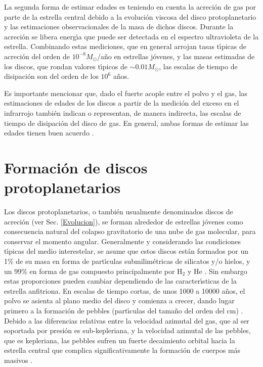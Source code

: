 \documentclass[baaa]{baaa}
\begin{document}
La segunda forma de estimar edades es teniendo en cuenta la acreci\'on de gas por parte de la estrella central debido a la evoluci\'on viscosa del disco protoplanetario y las estimaciones observacionales de la masa de dichos discos. Durante la acreci\'on se libera energ\'{\i}a que puede ser detectada en el espectro ultravioleta de la estrella. Combinando estas mediciones, que en general arrojan tasas t\'{\i}picas de acreci\'on del orden de $10^{-8}M_\odot$/a\~no en estrellas j\'ovenes, y las masas estimadas de los discos, que rondan valores t\'{\i}picos de $\sim0.01M_\odot$, las escalas de tiempo de disipaci\'on son del orden de los $10^6$ a\~nos. 

Es importante mencionar que, dado el fuerte acople entre el polvo y el gas, las estimaciones de edades de los discos a partir de la medici\'on del exceso en el infrarrojo tambi\'en indican o representan, de manera indirecta, las escalas de tiempo de disipaci\'on del disco de gas. En general, ambas formas de estimar las edades tienen buen acuerdo \citep[ver la fig. 4 de][]{Fedele2010}.

\section{Formación de discos protoplanetarios}\label{Formacion}

Los discos protoplanetarios, o tambi\'en usualmente denominados discos de acreci\'on (ver Sec. \ref{Evolucion}), se forman alrededor de estrellas j\'ovenes como consecuencia natural del colapso gravitatorio de una nube de gas molecular, para conservar el momento angular. Generalmente y considerando las condiciones t\'{\i}picas del medio interestelar, se asume que estos discos est\'an formados por un 1\% de su masa en forma de part\'{\i}culas submilim\'etricas de silicatos y/o hielos, y un 99\% en forma de gas compuesto principalmente por H$_2$ y He \citep{Armitage2010}. Sin embargo estas proporciones pueden cambiar dependiendo de las caracter\'{\i}sticas de la estrella anfitriona. En escalas de tiempo cortas, de unos 1000 a 10000 a\~nos, el polvo se asienta al plano medio del disco y comienza a crecer, dando lugar primero a la formaci\'on de pebbles (part\'{\i}culas del tama\~no del orden del cm) \citep{Weidenschilling1977,Brauer2008}. Debido a las diferencias relativas entre la velocidad azimutal del gas, que al ser soportada por presi\'on es sub-kepleriana, y la velocidad azimutal de las pebbles, que es kepleriana, las pebbles sufren un fuerte decaimiento orbital hacia la estrella central que complica significativamente la formaci\'on de cuerpos m\'as masivos \citep{Weidenschilling1977}. 
\end{document}
